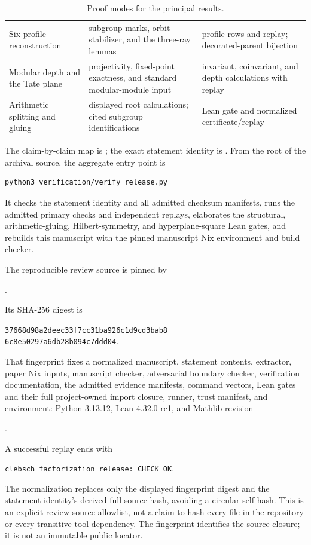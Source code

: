 \documentclass[11pt]{article}
\theoremstyle{definition}
\theoremstyle{remark}
\begin{document}
\begin{table}[ht]
\begin{tabular}{@{}>{\raggedright\arraybackslash}p{}
                    >{\raggedright\arraybackslash}p{}
                    >{\raggedright\arraybackslash}p{}@{}}
Six-profile reconstruction
& subgroup marks, orbit--stabilizer, and the three-ray lemmas
& profile rows and replay; decorated-parent bijection \\
Modular depth and the Tate plane
& projectivity, fixed-point exactness, and standard modular-module input
& invariant, coinvariant, and depth calculations with replay \\
Arithmetic splitting and gluing
& displayed root calculations; cited subgroup identifications
& Lean gate and normalized certificate/replay \\
\bottomrule
\end{tabular}
\caption{Proof modes for the principal results.}
\label{tab:verification}
\end{table}

The claim-by-claim map is
; the exact statement
identity is .  From the root
of the archival source, the aggregate entry point is
\begin{verbatim}
python3 verification/verify_release.py
\end{verbatim}
It checks the statement identity and all admitted checksum manifests, runs
the admitted primary checks and independent replays, elaborates the
structural, arithmetic-gluing, Hilbert-symmetry, and
hyperplane-square Lean gates, and rebuilds this manuscript with the pinned
manuscript Nix environment and build checker.

The reproducible review source is pinned by
\begin{center}
\small{}.
\end{center}
Its SHA-256 digest is
\begin{center}
\small\texttt{37668d98a2deec33f7cc31ba926c1d9cd3bab8}\\[-2pt]
\texttt{6c8e50297a6db28b094c7ddd04}.
\end{center}
That fingerprint fixes a normalized manuscript, statement contents,
extractor, paper Nix inputs, manuscript checker, adversarial boundary checker,
verification documentation, the admitted evidence manifests, command vectors,
Lean gates and their full project-owned import closure, runner, trust manifest, and
environment: Python 3.13.12, Lean
4.32.0-rc1, and Mathlib revision
\begin{center}
\small{}.
\end{center}
A successful replay ends with
\begin{center}
\texttt{clebsch factorization release: CHECK OK}.
\end{center}
The normalization replaces only the displayed fingerprint digest and
the statement identity's derived full-source hash, avoiding a circular
self-hash.  This is an explicit review-source allowlist, not a claim to
hash every file in the repository or every transitive tool dependency.
The fingerprint identifies the source closure; it is not an immutable
public locator.
\end{document}
